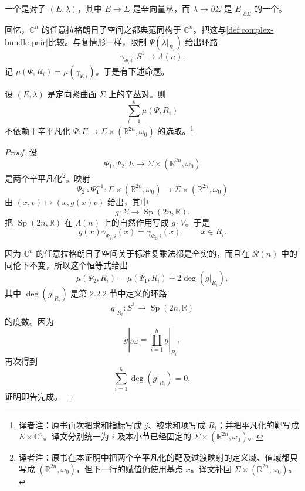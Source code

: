 \begin{definition}
\label{def:symplectic-bundle-pair}
一个\termSymplecticBundlePair{}是对子 $(E,\lambda)$，其中
$E\to\Sigma$ 是辛向量丛，而 $\lambda\to\partial\Sigma$ 是
$E|_{\partial\Sigma}$ 的一个\termLagrangianSubbundle{}。
\end{definition}

回忆，$\mathbb C^n$ 的任意拉格朗日子空间之\termComplexification{}都典范同构于
$\mathbb C^n$。把这与\cref{def:complex-bundle-pair}比较。与复情形一样，限制
$\Psi(\lambda|_{R_i})$ 给出环路
\[
  \gamma_{\Psi,i}:S^1\longrightarrow\Lambda(n).
\]
记 $\mu(\Psi,R_i)=\mu(\gamma_{\Psi,i})$。于是有下述命题。

\begin{proposition}
\label{prop:symplectic-bundle-pair-index-trivialization}
设 $(E,\lambda)$ 是定向紧曲面 $\Sigma$ 上的辛丛对。则
\[
  \sum_{i=1}^h\mu(\Psi,R_i)
\]
不依赖于辛平凡化
$\Psi:E\to\Sigma\times(\mathbb R^{2n},\omega_0)$ 的选取。\footnote{译者注：原书再次把求和指标写成 $j$、被求和项写成 $R_i$；并把平凡化的靶写成 $E\times\mathbb C^n$。译文分别统一为 $i$ 及本小节已经固定的 $\Sigma\times(\mathbb R^{2n},\omega_0)$。}
\end{proposition}

\begin{proof}
设
\[
  \Psi_1,\Psi_2:
  E\longrightarrow\Sigma\times(\mathbb R^{2n},\omega_0)
\]
是两个辛平凡化\footnote{译者注：原书在本证明中把两个辛平凡化的靶及过渡映射的定义域、值域都只写成
$(\mathbb R^{2n},\omega_0)$，但下一行的赋值仍使用基点 $x$。译文补回
$\Sigma\times(\mathbb R^{2n},\omega_0)$。}。映射
\[
  \Psi_2\circ\Psi_1^{-1}:
  \Sigma\times(\mathbb R^{2n},\omega_0)
  \longrightarrow
  \Sigma\times(\mathbb R^{2n},\omega_0)
\]
由 $(x,v)\mapsto(x,g(x)v)$ 给出，其中
\[
  g:\Sigma\longrightarrow\operatorname{Sp}(2n,\mathbb R).
\]
把 $\operatorname{Sp}(2n,\mathbb R)$ 在 $\Lambda(n)$ 上的自然作用写成
$g\cdot V$。于是
\[
  g(x)\gamma_{\Psi_1,i}(x)=\gamma_{\Psi_2,i}(x),
  \qquad x\in R_i.
\]

因为 $\mathbb C^n$ 的任意拉格朗日子空间关于标准复乘法都是全实的，而且\termGeneralizedMaslovIndex{}在 $\mathcal R(n)$ 中的同伦下不变，所以这个恒等式给出
\[
  \mu(\Psi_2,R_i)=\mu(\Psi_1,R_i)+2\deg(g|_{R_i}),
\]
其中 $\deg(g|_{R_i})$ 是第 2.2.2 节中定义的环路
\[
  g|_{R_i}:S^1\longrightarrow\operatorname{Sp}(2n,\mathbb R)
\]
的度数。因为
\[
  g|_{\partial\Sigma}=\coprod_{i=1}^h g|_{R_i},
\]
再次得到
\[
  \sum_{i=1}^h\deg(g|_{R_i})=0,
\]
证明即告完成。
\end{proof}

